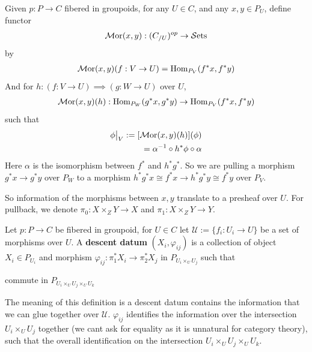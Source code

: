 \begin{definition}
    Given $p:P\to C$ fibered in groupoids, for any $U\in C$, and any $x,y\in P_U$, define functor 
    \begin{align*}
        \operatorname{\mathcal{M}\mathrm{or}}(x,y):(C_{/U})^{op}\to \operatorname{\mathcal{S}ets}
    \end{align*}by 
\begin{align*}
    \operatorname{\mathcal{M}\mathrm{or}}(x,y)(f:V\to U)=\operatorname{Hom}_{P_V}(f^*x, f^*y)
\end{align*}
And for $h:(f:V\to U)\implies  (g:W\to U)$ over $U$, 
\begin{align*}
    \operatorname{\mathcal{M}\mathrm{or}}(x,y)(h):\operatorname{Hom}_{P_W}(g^*x, g^*y)\to \operatorname{Hom}_{P_V}(f^*x, f^*y)
\end{align*} such that 
\begin{align*}
      \phi\big|_V:=[\operatorname{\mathcal{M}\mathrm{or}}(x,y)(h)](\phi)
      \\=\alpha^{-1}\circ h^*\phi \circ \alpha
\end{align*}
Here $\alpha$ is the isomorphism between $f^*$ and $h^*g^*$.
So we are pulling a morphism $g^*x\to g^*y$ over $P_W$ to a morphism $h^*g^*x\cong f^*x\to h^*g^*y\cong f^*y$ over $P_V$. 
\end{definition}

So information of the morphisms between $x, y$ translate to a presheaf over $U$. 
For pullback, we denote $\pi_0:X\times_Z Y\to X$ and $\pi_1:X\times _ZY\to Y$.
\begin{definition}
      Let $p:P\to C$ be fibered in groupoid, for $U\in C$ let $\mathcal{U}:=\{f_i:U_i\to U\}$ be a set of morphisms over $U$. A \textbf{descent datum} $(X_i,\varphi_{ij})$ is a collection of object $X_i\in P_{U_i}$ and morphism $\varphi_{ij}:\pi_1^*X_i\to \pi_2^*X_j$ in $P_{U_i\times _UU_j} $ such that 
     \begin{center}
     \end{center}
 commute in $P_{U_i\times_U U_j \times _U U_k}$
 \end{definition}
The meaning of this definition is a descent datum contains the information that we can glue together over $\mathcal{U}$. $\varphi_{ij}$ identifies the information over the intersection $U_i\times _UU_j$ together (we cant ask for equality as it is unnatural for category theory), such that the overall identification on the intersection $U_i\times_U U_j\times _UU_k$.


